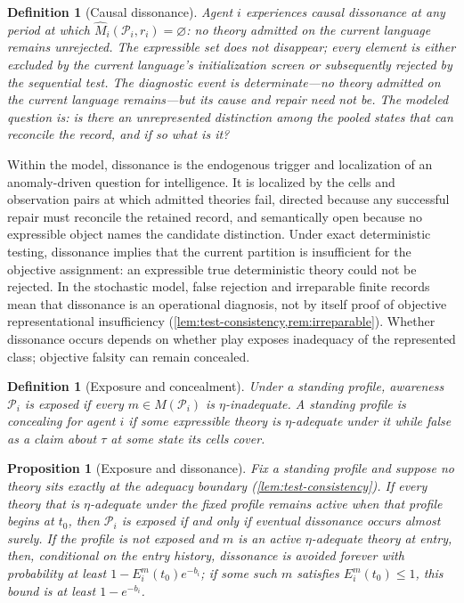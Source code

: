 \documentclass[11pt]{article}
\newtheorem{definition}[assumption]{Definition}
\newtheorem{proposition}[assumption]{Proposition}
\theoremstyle{definition}
\newcommand{\emptysetset}{\varnothing}
\begin{document}
\begin{definition}[Causal dissonance]
\label{def:dissonance}
Agent $i$ experiences \emph{causal dissonance} at any period at which $\widehat M_i(\mathcal P_i,r_i)=\emptysetset$: no theory admitted on the current language remains unrejected.
The expressible set does not disappear; every element is either excluded by the current language's initialization screen or subsequently rejected by the sequential test.
The diagnostic event is determinate---no theory admitted on the current language remains---but its cause and repair need not be.
The modeled question is: \emph{is there an unrepresented distinction among the pooled states that can reconcile the record, and if so what is it?}
\end{definition}

Within the model, dissonance is the endogenous trigger and localization of an anomaly-driven question for intelligence.
It is localized by the cells and observation pairs at which admitted theories fail, directed because any successful repair must reconcile the retained record, and semantically open because no expressible object names the candidate distinction.
Under exact deterministic testing, dissonance implies that the current partition is insufficient for the objective assignment: an expressible true deterministic theory could not be rejected.
In the stochastic model, false rejection and irreparable finite records mean that dissonance is an operational diagnosis, not by itself proof of objective representational insufficiency (\cref{lem:test-consistency,rem:irreparable}).
Whether dissonance occurs depends on whether play exposes inadequacy of the represented class; objective falsity can remain concealed.

\begin{definition}[Exposure and concealment]
\label{def:exposure}
Under a standing profile, awareness $\mathcal P_i$ is \emph{exposed} if every $m\in M(\mathcal P_i)$ is $\eta$-inadequate.
A standing profile is \emph{concealing} for agent $i$ if some expressible theory is $\eta$-adequate under it while false as a claim about $\tau$ at some state its cells cover.
\end{definition}

\begin{proposition}[Exposure and dissonance]
\label{prop:exposure}
Fix a standing profile and suppose no theory sits exactly at the adequacy boundary (\cref{lem:test-consistency}).
If every theory that is $\eta$-adequate under the fixed profile remains active when that profile begins at $t_0$, then $\mathcal P_i$ is exposed if and only if eventual dissonance occurs almost surely.
If the profile is not exposed and $m$ is an active $\eta$-adequate theory at entry, then, conditional on the entry history, dissonance is avoided forever with probability at least $1-E_i^m(t_0)e^{-b_i}$; if some such $m$ satisfies $E_i^m(t_0)\le1$, this bound is at least $1-e^{-b_i}$.
\end{proposition}
\end{document}
